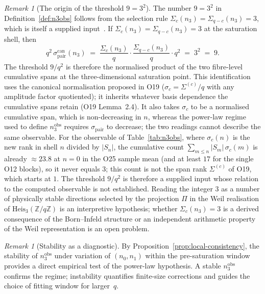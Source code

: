 \documentclass[11pt,a4paper]{article}
\theoremstyle{definition}
\theoremstyle{remark}
\newtheorem{remark}[theorem]{Remark}
\begin{document}
  \begin{remark}[The origin of the threshold $9 = 3^2$]
    \label{rem:origin-9}
    The number $9 = 3^2$ in Definition~\ref{def:n3obs} follows
    from the selection rule $\Sigma_c(n_3) = \Sigma_{q-c}(n_3) = 3$,
    which is itself a supplied input~\cite{Beau2026a28}.
    If $\Sigma_c(n_3) = \Sigma_{q-c}(n_3) = 3$ at the
    saturation shell, then
    \[
      q^2\,\sigma_{\mathrm{pair}}^{\mathrm{can}}(n_3)
      \;=\;
      \frac{\Sigma_c(n_3)}{q} \cdot
      \frac{\Sigma_{q-c}(n_3)}{q} \cdot q^2
      \;=\; 3^2 \;=\; 9.
    \]
    The threshold $9/q^2$ is therefore the normalised product of
    the two fibre-level cumulative spans at the
    three-dimensional saturation point.
    This identification uses the canonical normalisation proposed in
    O19 ($\sigma_c = \Sigma^{(c)}/q$ with any amplitude factor
    quotiented); it inherits whatever basis dependence the
    cumulative spans retain (O19 Lemma~2.4).
    It also takes $\sigma_c$ to be a normalised cumulative span, which is
    non-decreasing in $n$, whereas the power-law regime used to define
    $n_3^{\mathrm{obs}}$ requires $\sigma_{\mathrm{pair}}$ to decrease; the
    two readings cannot describe the same observable.
    For the observable of Table~\ref{tab:n3obs}, where $\sigma_c(n)$ is the new
    rank in shell $n$ divided by $|S_n|$, the cumulative count
    $\sum_{m\le n}|S_m|\,\sigma_c(m)$ is already $\approx 23.8$ at $n=0$ in the
    O25 sample mean (and at least $17$ for the single O12 blocks), so it never
    equals $3$; this count is not the span rank $\Sigma^{(c)}$ of O19, which
    starts at $1$.
    The threshold $9/q^2$ is therefore a supplied input whose relation to the
    computed observable is not established.
    Reading the integer $3$ as a number of physically stable
    directions selected by the projection $\Pi$ in the Weil
    realisation of $\mathrm{Heis}_3(\mathbb{Z}/q\mathbb{Z})$ is an
    interpretive hypothesis;
    whether $\Sigma_c(n_3) = 3$ is a derived consequence of the
    Born--Infeld structure or an independent arithmetic property
    of the Weil representation is an open problem.
  \end{remark}

  \begin{remark}[Stability as a diagnostic]
    \label{rem:stability-diagnostic}
    By Proposition~\ref{prop:local-consistency}, the stability
    of $n_3^{\mathrm{obs}}$ under variation of $(n_0, n_1)$
    within the pre-saturation window provides a direct empirical
    test of the power-law hypothesis.
    A stable $n_3^{\mathrm{obs}}$ confirms the regime;
    instability quantifies finite-size corrections and guides
    the choice of fitting window for larger~$q$.
  \end{remark}
\end{document}
